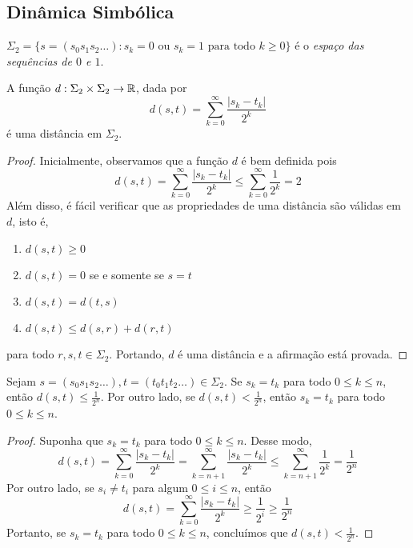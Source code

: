 \subsection{Dinâmica Simbólica}

\begin{definition}
$\Sigma_2 = \{s = (s_0s_1s_2\dots) : s_k = 0 \textrm{ ou } s_k = 1 \textrm{ para todo } k\geq 0\}$ é o \textit{espaço das sequências de $0$ e $1$}.
\end{definition}

\begin{proposition}
A função $d: \Sigma_2 \times \Sigma_2 \to \mathbb{R}$, dada por
$$d(s, t) = \sum_{k=0}^{\infty} \frac{|s_k - t_k|}{2^k}$$
é uma distância em $\Sigma_2$.
\end{proposition}

\begin{proof}
Inicialmente, observamos que a função $d$ é bem definida pois
$$d(s, t) = \sum_{k=0}^{\infty} \frac{|s_k - t_k|}{2^k} \leq \sum_{k=0}^{\infty} \frac{1}{2^k} = 2$$
Além disso, é fácil verificar que as propriedades de uma distância são válidas em $d$, isto é,
\begin{enumerate}[label=(\alph*)]
\item $d(s, t) \geq 0$
\item $d(s, t) = 0$ se e somente se $s = t$
\item  $d(s, t) = d(t, s)$
\item $d(s, t) \leq d(s, r) + d(r, t)$
\end{enumerate}
para todo $r, s, t \in \Sigma_2$. Portando, $d$ é uma distância e a afirmação está provada.
\end{proof}

\begin{proposition}
\label{proposicao dinamicasimbolica 1}
Sejam $s = (s_0s_1s_2\dots) , t = (t_0t_1t_2\dots) \in \Sigma_2$. Se $s_k = t_ k$ para todo $0 \leq k \leq n$, então $d(s, t) \leq \frac{1}{2^n}$. Por outro lado, se $d(s, t) < \frac{1}{2^n}$, então $s_k = t_k$ para todo $0 \leq k \leq n$.
\end{proposition}

\begin{proof}
Suponha que $s_k = t_ k$ para todo $0 \leq k \leq n$. Desse modo, $$d(s, t) = \sum_{k=0}^{\infty} \frac{|s_k - t_k|}{2^k} = \sum_{k=n+1}^{\infty} \frac{|s_k - t_k|}{2^k} \leq \sum_{k=n+1}^{\infty} \frac{1}{2^k} = \frac{1}{2^n}$$
Por outro lado, se $s_i \neq t_i$ para algum $0 \leq i \leq n$, então $$d(s, t) = \sum_{k=0}^{\infty} \frac{|s_k - t_k|}{2^k} \geq \frac{1}{2^i} \geq \frac{1}{2^n}$$ Portanto, se $s_k = t_k$ para todo $0 \leq k \leq n$, concluímos que $d(s, t) < \frac{1}{2^n}$.
\end{proof}

